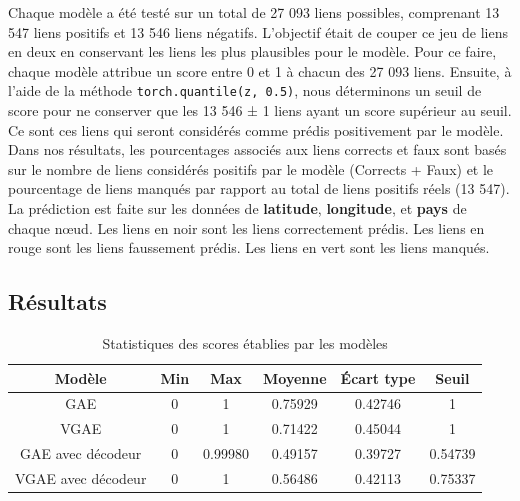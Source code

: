 \documentclass{article}
\begin{document}
Chaque modèle a été testé sur un total de 27 093 liens possibles, comprenant 13 547 liens positifs et 13 546 liens négatifs. L'objectif était de couper ce jeu de liens en deux en conservant les liens les plus plausibles pour le modèle. Pour ce faire, chaque modèle attribue un score entre 0 et 1 à chacun des 27 093 liens. Ensuite, à l'aide de la méthode \texttt{torch.quantile(z, 0.5)}, nous déterminons un seuil de score pour ne conserver que les 13 546 ± 1 liens ayant un score supérieur au seuil. Ce sont ces liens qui seront considérés comme prédis positivement par le modèle. Dans nos résultats, les pourcentages associés aux liens corrects et faux sont basés sur le nombre de liens considérés positifs par le modèle (Corrects + Faux) et le pourcentage de liens manqués par rapport au total de liens positifs réels (13 547).
La prédiction est faite sur les données de \textbf{latitude}, \textbf{longitude},  et \textbf{pays} de chaque nœud.\newline
\newline
Les liens en noir sont les liens correctement prédis.\newline
Les liens en rouge sont les liens faussement prédis.\newline
Les liens en vert sont les liens manqués.

\subsection{Résultats}

\begin{table}[H]
    \centering
    \begin{tabular}{|c|c|c|c|c|c|}
        \hline
        Modèle & Min & Max & Moyenne & Écart type & Seuil\\
        \hline
        GAE & 0 & 1 & 0.75929 & 0.42746 & 1\\
        VGAE & 0 & 1 & 0.71422 & 0.45044 & 1\\
        GAE avec décodeur & 0 & 0.99980 & 0.49157 & 0.39727 & 0.54739\\
        VGAE avec décodeur & 0 & 1 & 0.56486 & 0.42113 & 0.75337\\
        \hline
    \end{tabular}
    \caption{Statistiques des scores établies par les modèles}
    \label{tab:statistiques_scores}
\end{table}
\end{document}
